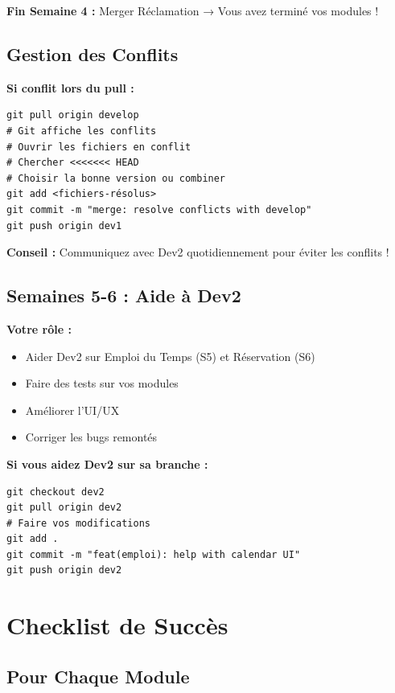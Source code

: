 \documentclass[11pt,a4paper]{article}
\begin{document}
\textbf{Fin Semaine 4 :} Merger Réclamation → Vous avez terminé vos modules !

\subsection{Gestion des Conflits}

\textbf{Si conflit lors du pull :}
\begin{verbatim}
git pull origin develop
# Git affiche les conflits
# Ouvrir les fichiers en conflit
# Chercher <<<<<<< HEAD
# Choisir la bonne version ou combiner
git add <fichiers-résolus>
git commit -m "merge: resolve conflicts with develop"
git push origin dev1
\end{verbatim}

\textbf{Conseil :} Communiquez avec Dev2 quotidiennement pour éviter les conflits !

\subsection{Semaines 5-6 : Aide à Dev2}

\textbf{Votre rôle :}
\begin{itemize}
    \item Aider Dev2 sur Emploi du Temps (S5) et Réservation (S6)
    \item Faire des tests sur vos modules
    \item Améliorer l'UI/UX
    \item Corriger les bugs remontés
\end{itemize}

\textbf{Si vous aidez Dev2 sur sa branche :}
\begin{verbatim}
git checkout dev2
git pull origin dev2
# Faire vos modifications
git add .
git commit -m "feat(emploi): help with calendar UI"
git push origin dev2
\end{verbatim}

\newpage

\section{Checklist de Succès}

\subsection{Pour Chaque Module}
\end{document}
